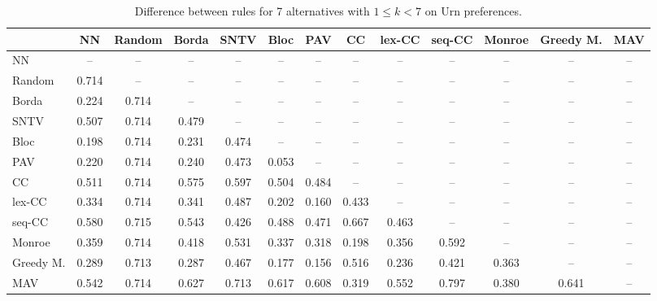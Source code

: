 
\begin{table*}[htbp]
\centering
\begin{tabular}{lcccccccccccc}
\toprule
 & NN & Random & Borda & SNTV & Bloc & PAV & CC & lex-CC & seq-CC & Monroe & Greedy M. & MAV \\
\midrule
NN & -- & -- & -- & -- & -- & -- & -- & -- & -- & -- & -- & -- \\
Random & \cellcolor{blue!71} 0.714 & -- & -- & -- & -- & -- & -- & -- & -- & -- & -- & -- \\
Borda & \cellcolor{blue!22} 0.224 & \cellcolor{blue!71} 0.714 & -- & -- & -- & -- & -- & -- & -- & -- & -- & -- \\
SNTV & \cellcolor{blue!50} 0.507 & \cellcolor{blue!71} 0.714 & \cellcolor{blue!47} 0.479 & -- & -- & -- & -- & -- & -- & -- & -- & -- \\
Bloc & \cellcolor{blue!19} 0.198 & \cellcolor{blue!71} 0.714 & \cellcolor{blue!23} 0.231 & \cellcolor{blue!47} 0.474 & -- & -- & -- & -- & -- & -- & -- & -- \\
PAV & \cellcolor{blue!22} 0.220 & \cellcolor{blue!71} 0.714 & \cellcolor{blue!24} 0.240 & \cellcolor{blue!47} 0.473 & \cellcolor{blue!5} 0.053 & -- & -- & -- & -- & -- & -- & -- \\
CC & \cellcolor{blue!51} 0.511 & \cellcolor{blue!71} 0.714 & \cellcolor{blue!57} 0.575 & \cellcolor{blue!59} 0.597 & \cellcolor{blue!50} 0.504 & \cellcolor{blue!48} 0.484 & -- & -- & -- & -- & -- & -- \\
lex-CC & \cellcolor{blue!33} 0.334 & \cellcolor{blue!71} 0.714 & \cellcolor{blue!34} 0.341 & \cellcolor{blue!48} 0.487 & \cellcolor{blue!20} 0.202 & \cellcolor{blue!16} 0.160 & \cellcolor{blue!43} 0.433 & -- & -- & -- & -- & -- \\
seq-CC & \cellcolor{blue!57} 0.580 & \cellcolor{blue!71} 0.715 & \cellcolor{blue!54} 0.543 & \cellcolor{blue!42} 0.426 & \cellcolor{blue!48} 0.488 & \cellcolor{blue!47} 0.471 & \cellcolor{blue!66} 0.667 & \cellcolor{blue!46} 0.463 & -- & -- & -- & -- \\
Monroe & \cellcolor{blue!35} 0.359 & \cellcolor{blue!71} 0.714 & \cellcolor{blue!41} 0.418 & \cellcolor{blue!53} 0.531 & \cellcolor{blue!33} 0.337 & \cellcolor{blue!31} 0.318 & \cellcolor{blue!19} 0.198 & \cellcolor{blue!35} 0.356 & \cellcolor{blue!59} 0.592 & -- & -- & -- \\
Greedy M. & \cellcolor{blue!28} 0.289 & \cellcolor{blue!71} 0.713 & \cellcolor{blue!28} 0.287 & \cellcolor{blue!46} 0.467 & \cellcolor{blue!17} 0.177 & \cellcolor{blue!15} 0.156 & \cellcolor{blue!51} 0.516 & \cellcolor{blue!23} 0.236 & \cellcolor{blue!42} 0.421 & \cellcolor{blue!36} 0.363 & -- & -- \\
MAV & \cellcolor{blue!54} 0.542 & \cellcolor{blue!71} 0.714 & \cellcolor{blue!62} 0.627 & \cellcolor{blue!71} 0.713 & \cellcolor{blue!61} 0.617 & \cellcolor{blue!60} 0.608 & \cellcolor{blue!31} 0.319 & \cellcolor{blue!55} 0.552 & \cellcolor{blue!79} 0.797 & \cellcolor{blue!38} 0.380 & \cellcolor{blue!64} 0.641 & -- \\
\bottomrule
\end{tabular}

\caption{Difference between rules for 7 alternatives with $1 \leq k < 7$ on Urn preferences.}
\label{tab:rule_distance_heatmap-m=[7]-pref_dist=URN-R}
\end{table*}
    